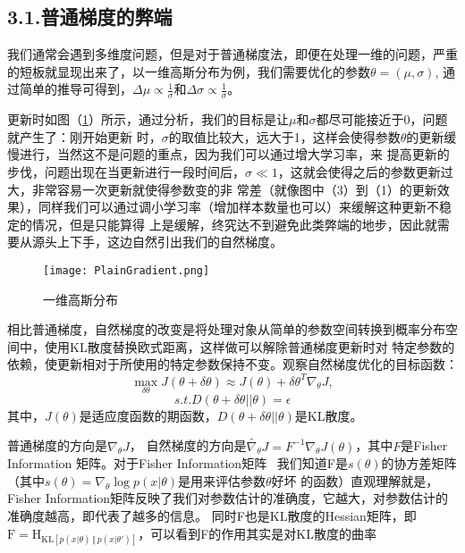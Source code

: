 \documentclass[lang=cn,11pt,cite=super]{elegantpaper}
\begin{document}
\subsection*{\textcolor[RGB]{60,113,183}{3.1.普通梯度的弊端}}
我们通常会遇到多维度问题，但是对于普通梯度法，即便在处理一维的问题，严重的短板就显现出来了，以一维高斯分布为例，我们需要优化的参数$\theta = ( \mu, \sigma )$,
通过简单的推导可得到，$ \Delta \mu \propto \frac{1}{\sigma}$和$ \Delta \sigma \propto \frac{1}{\sigma}$。
\par
更新时如图（\ref{GaussDistribution}）所示，通过分析，我们的目标是让$\mu$和$\sigma$都尽可能接近于0，问题就产生了：刚开始更新
时，$\sigma$的取值比较大，远大于1，这样会使得参数$\theta$的更新缓慢进行，当然这不是问题的重点，因为我们可以通过增大学习率，来
提高更新的步伐，问题出现在当更新进行一段时间后，$\sigma \ll 1$，这就会使得之后的参数更新过大，非常容易一次更新就使得参数变的非
常差（就像图中（3）到（1）的更新效果），同样我们可以通过调小学习率（增加样本数量也可以）来缓解这种更新不稳定的情况，但是只能算得
上是缓解，终究达不到避免此类弊端的地步，因此就需要从源头上下手，这边自然引出我们的自然梯度。
\begin{figure}[htbp]
  \centering
  \texttt{[image: PlainGradient.png]}
  \caption{一维高斯分布}\label{GaussDistribution}
\end{figure}
\par
相比普通梯度，自然梯度的改变是将处理对象从简单的参数空间转换到概率分布空间中，使用KL散度替换欧式距离，这样做可以解除普通梯度更新时对
特定参数的依赖，使更新相对于所使用的特定参数保持不变。观察自然梯度优化的目标函数：
\begin{equation*}
  \mathop{\max}\limits_{\delta \theta} J(\theta + \delta \theta) \approx J(\theta) + \delta \theta ^T \nabla_{\theta}J,
\end{equation*}
\begin{equation*}
  s.t. D(\theta + \delta \theta || \theta) = \epsilon
\end{equation*}
其中，$J(\theta)$是适应度函数的期函数，$D(\theta+\delta \theta||\theta)$是KL散度。
\par
普通梯度的方向是$\nabla _{\theta}J$，
自然梯度的方向是$ \tilde{\nabla _{\theta}}J = F^{-1}\nabla _{\theta}J(\theta)$，其中$F$是Fisher Information 矩阵。对于Fisher Information矩阵~\cite{FIM}
我们知道F是$s(\theta)$的协方差矩阵（其中$s(\theta)=\nabla_{\theta} \log p(x|\theta)$是用来评估参数$\theta$好坏
的函数）直观理解就是，Fisher Information矩阵反映了我们对参数估计的准确度，它越大，对参数估计的准确度越高，即代表了越多的信息。
同时F也是KL散度的Hessian矩阵，即$\text{F}=\text{H}_{\text{KL}[p(x \vert \theta) \, \Vert \, p(x \vert \theta')]}$，可以看到F的作用其实是对KL散度的曲率
\end{document}

